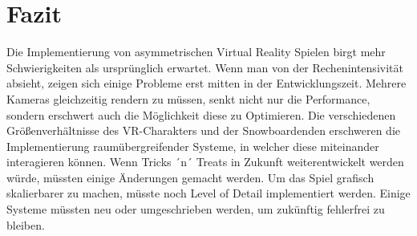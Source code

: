 \chapter{Fazit}
Die Implementierung von asymmetrischen Virtual Reality Spielen birgt mehr Schwierigkeiten als ursprünglich erwartet. Wenn man von der Rechenintensivität absieht, zeigen sich einige Probleme erst mitten in der Entwicklungszeit. Mehrere Kameras gleichzeitig rendern zu müssen, senkt nicht nur die Performance, sondern erschwert auch die Möglichkeit diese zu Optimieren. Die verschiedenen Größenverhältnisse des VR-Charakters und der Snowboardenden erschweren die Implementierung raumübergreifender Systeme, in welcher diese miteinander interagieren können. Wenn Tricks ´n´ Treats in Zukunft weiterentwickelt werden würde, müssten einige Änderungen gemacht werden. Um das Spiel grafisch skalierbarer zu machen, müsste noch Level of Detail implementiert werden. Einige Systeme müssten neu oder umgeschrieben werden, um zukünftig fehlerfrei zu bleiben.
